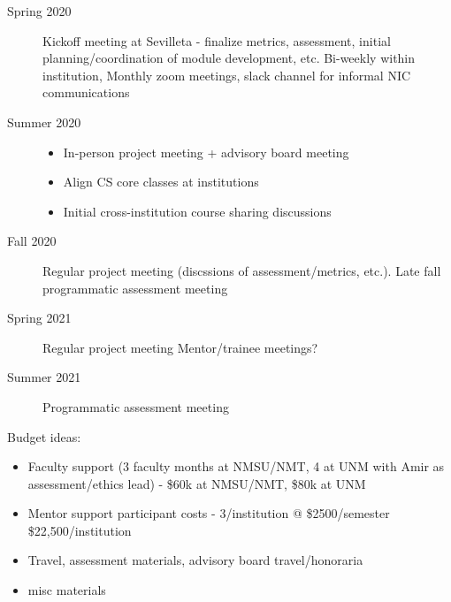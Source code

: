 \begin{description}
    \item[Spring 2020] Kickoff meeting at Sevilleta - finalize metrics, assessment, initial planning/coordination of module development, etc. Bi-weekly within institution, Monthly zoom meetings, slack channel for informal NIC communications
    \item[Summer 2020] 
    \begin{itemize}
        \item In-person project meeting + advisory board meeting
        \item Align CS core classes at institutions 
        \item Initial cross-institution course sharing discussions
    \end{itemize}
    \item[Fall 2020] Regular project meeting (discssions of assessment/metrics, etc.). Late fall programmatic assessment meeting
    \item[Spring 2021] Regular project meeting Mentor/trainee meetings?
    \item[Summer 2021] Programmatic assessment meeting
\end{description}

Budget ideas:
\begin{itemize}
    \item Faculty support (3 faculty months at NMSU/NMT, 4 at UNM with Amir as assessment/ethics lead) - \$60k at NMSU/NMT, \$80k at UNM
    \item Mentor support participant costs - 3/institution @ \$2500/semester \$22,500/institution
    \item Travel, assessment materials, advisory board travel/honoraria
    \item misc materials
\end{itemize}
